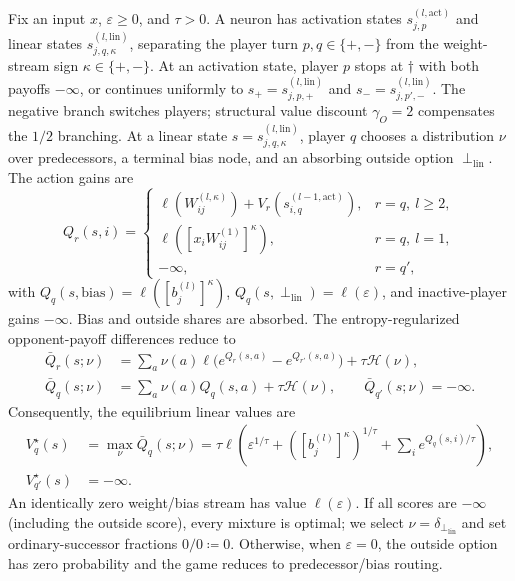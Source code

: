 \begin{definition}\label{ptnb:def:routing-recursion}
Fix an input $x$, $\varepsilon\geq0$, and $\tau>0$. A neuron has activation states $s_{j,p}^{(l,\mathrm{act})}$ and linear states $s_{j,q,\kappa}^{(l,\mathrm{lin})}$, separating the player turn $p,q\in\{+,-\}$ from the weight-stream sign $\kappa\in\{+,-\}$.
At an activation state, player $p$ stops at $\dagger$ with both payoffs $-\infty$, or continues uniformly to $s_+=s_{j,p,+}^{(l,\mathrm{lin})}$ and $s_-=s_{j,p',-}^{(l,\mathrm{lin})}$. The negative branch switches players; structural value discount $\gamma_O=2$ compensates the $1/2$ branching.
At a linear state $s=s_{j,q,\kappa}^{(l,\mathrm{lin})}$, player $q$ chooses a distribution $\nu$ over predecessors, a terminal bias node, and an absorbing outside option $\perp_{\mathrm{lin}}$. The action gains are
\begin{equation}\label{ptnb:eq:routing-linear-action}
 Q_r(s,i)=\begin{cases}
 \ell(W_{ij}^{(l,\kappa)})+V_r(s_{i,q}^{(l-1,\mathrm{act})}),&r=q,\ l\geq2,\\
 \ell([x_iW_{ij}^{(1)}]^\kappa),&r=q,\ l=1,\\
 -\infty,&r=q',
 \end{cases}
\end{equation}
with $Q_q(s,\mathrm{bias})=\ell([b_j^{(l)}]^\kappa)$, $Q_q(s,\perp_{\mathrm{lin}})=\ell(\varepsilon)$, and inactive-player gains $-\infty$. Bias and outside shares are absorbed. The entropy-regularized opponent-payoff differences reduce to
\begin{align}\label{ptnb:eq:optimal-linear}
 \bar Q_r(s;\nu)&=\sum_a\nu(a)\ell\bigl(e^{Q_r(s,a)}-e^{Q_{r'}(s,a)}\bigr)+\tau\mathcal H(\nu),\nonumber\\
 \bar Q_q(s;\nu)&=\sum_a\nu(a)Q_q(s,a)+\tau\mathcal H(\nu),\qquad \bar Q_{q'}(s;\nu)=-\infty.
\end{align}
Consequently, the equilibrium linear values are
\begin{align}\label{ptnb:eq:routing-linear-value}
 V_q^\star(s)&=\max_\nu\bar Q_q(s;\nu)
 =\tau\ell\!\left(\varepsilon^{1/\tau}+([b_j^{(l)}]^\kappa)^{1/\tau}+\sum_i e^{Q_q(s,i)/\tau}\right),\nonumber\\
 V_{q'}^\star(s)&=-\infty.
\end{align}
An identically zero weight/bias stream has value $\ell(\varepsilon)$. If all scores are $-\infty$ (including the outside score), every mixture is optimal; we select $\nu=\delta_{\perp_{\mathrm{lin}}}$ and set ordinary-successor fractions $0/0\coloneqq0$. Otherwise, when $\varepsilon=0$, the outside option has zero probability and the game reduces to predecessor/bias routing.


\end{definition}
